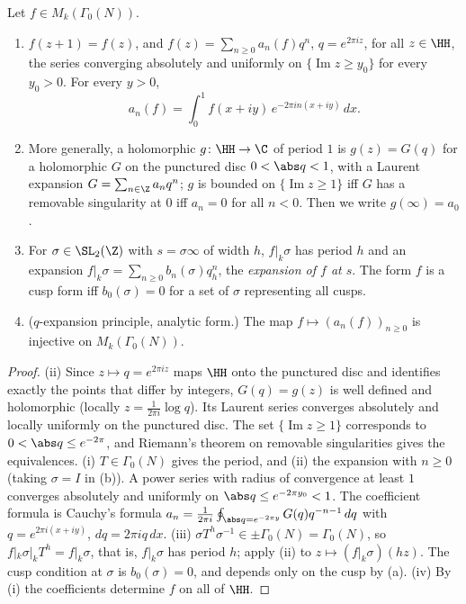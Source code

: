 \begin{proposition}[$q$-expansions]\label{prop:modforms:q-expansion}
Let $f\in M_k(\Gamma_0(N))$.
\begin{enumerate}[label=(\roman*)]
\item $f(z+1)=f(z)$, and $f(z)=\sum_{n\ge0}a_n(f)q^n$, $q=e^{2\pi iz}$, for all $z\in\HH$, the series converging absolutely and uniformly on $\{\operatorname{Im}z\ge y_0\}$ for every $y_0>0$.
For every $y>0$,
\[
a_n(f)=\int_0^1f(x+iy)\,e^{-2\pi in(x+iy)}\,dx .
\]
\item More generally, a holomorphic $g\colon\HH\to\C$ of period $1$ is $g(z)=G(q)$ for a holomorphic $G$ on the punctured disc $0<\abs q<1$, with a Laurent expansion
$G=\sum_{n\in\Z}a_nq^n$; $g$ is bounded on $\{\operatorname{Im}z\ge1\}$ iff $G$ has a removable singularity at $0$ iff $a_n=0$ for all $n<0$. Then we write $g(\infty)=a_0$.
\item For $\sigma\in\SL_2(\Z)$ with $s=\sigma\infty$ of width $h$, $f|_k\sigma$ has period $h$ and an expansion $f|_k\sigma=\sum_{n\ge0}b_n(\sigma)q_h^n$, the \emph{expansion of $f$ at $s$}. The form
$f$ is a cusp form iff $b_0(\sigma)=0$ for a set of $\sigma$ representing all cusps.
\item ($q$-expansion principle, analytic form.) The map $f\mapsto(a_n(f))_{n\ge0}$ is injective on $M_k(\Gamma_0(N))$.
\end{enumerate}
\end{proposition}

\begin{proof}
(ii) Since $z\mapsto q=e^{2\pi iz}$ maps $\HH$ onto the punctured disc and identifies exactly the points that differ by integers, $G(q)=g(z)$ is well defined and holomorphic (locally $z=\frac1{2\pi i}\log q$).
Its Laurent series converges absolutely and locally uniformly on the punctured disc. The set $\{\operatorname{Im}z\ge1\}$ corresponds to $0<\abs q\le e^{-2\pi}$, and Riemann's
theorem on removable singularities gives the equivalences.
(i) $T\in\Gamma_0(N)$ gives the period, and (ii) the expansion with $n\ge0$ (taking $\sigma=I$ in (b)). A power series with radius of
convergence at least $1$ converges absolutely and uniformly on $\abs q\le e^{-2\pi y_0}<1$. The coefficient formula is Cauchy's formula
$a_n=\frac1{2\pi i}\oint_{\abs q=e^{-2\pi y}}G(q)q^{-n-1}\,dq$ with $q=e^{2\pi i(x+iy)}$, $dq=2\pi iq\,dx$.
(iii) $\sigma T^h\sigma^{-1}\in\pm\Gamma_0(N)=\Gamma_0(N)$, so $f|_k\sigma|_kT^h=f|_k\sigma$, that is, $f|_k\sigma$ has period $h$; apply (ii) to $z\mapsto(f|_k\sigma)(hz)$. The cusp condition at $\sigma$ is
$b_0(\sigma)=0$, and depends only on the cusp by (a).
(iv) By (i) the coefficients determine $f$ on all of $\HH$.
\end{proof}

